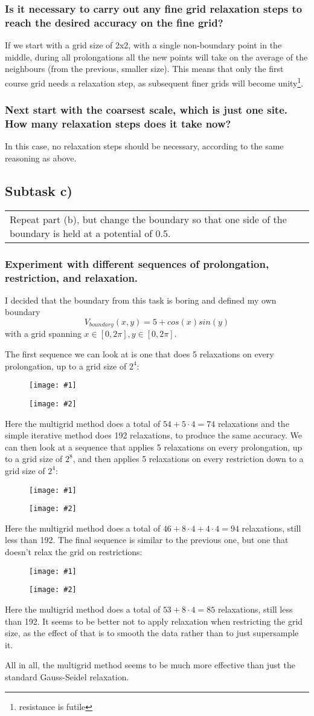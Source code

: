 \documentclass[11pt]{article}
\newcommand{\doublefigure}[2]{
\begin{figure}[H]
  \centering
  \begin{minipage}{0.4\textwidth}
    \centering
    \texttt{[image: \#1]}
  \end{minipage}
  \begin{minipage}{0.4\textwidth}
    \centering
    \texttt{[image: \#2]}
  \end{minipage}
\end{figure}
}
\newcommand{\task}[2]{
  \subsection*{Subtask #1)}
  \begin{tabular}{|p{0.9\textwidth}}
    #2\\
  \end{tabular}
}
\newcommand{\subtask}[1]{
  \subsubsection*{#1}
}
\begin{document}
\subtask{Is it necessary to carry out any fine grid relaxation steps to reach the desired accuracy on the fine grid?}
If we start with a grid size of 2x2, with a single non-boundary point in the middle, during all prolongations all the new points will take on the average of the neighbours (from the previous, smaller size).
This means that only the first course grid needs a relaxation step, as subsequent finer grids will become unity\footnote{resistance is futile}.

\subtask{Next start with the coarsest scale, which is just one site. How many relaxation steps does it take now?}
In this case, no relaxation steps should be necessary, according to the same reasoning as above.

\task{c}{
  Repeat part (b), but change the boundary so that one side of the boundary is held at a potential of 0.5.
}
\subtask{Experiment with different sequences of prolongation, restriction, and relaxation.}
I decided that the boundary from this task is boring and defined my own boundary
$$
V_{boundary}(x,y) = 5 + cos(x) sin(y)
$$
with a grid spanning $x\in[0, 2\pi], y\in[0, 2\pi]$.

The first sequence we can look at is one that does 5 relaxations on every prolongation, up to a grid size of $2^4$:
\doublefigure{./plots/1026/a_baseline_2.png}{./plots/1026/a_multigrid_2.png}
Here the multigrid method does a total of $54 + 5 \cdot 4 = 74$ relaxations and the simple iterative method does 192 relaxations, to produce the same accuracy.
\break
We can then look at a sequence that applies 5 relaxations on every prolongation, up to a grid size of $2^8$,
and then applies 5 relaxations on every restriction down to a grid size of $2^4$:
\doublefigure{./plots/1026/a_baseline_3.png}{./plots/1026/a_multigrid_3.png}
Here the multigrid method does a total of $46 + 8 \cdot 4 + 4 \cdot 4 = 94$ relaxations, still less than 192.
\break
The final sequence is similar to the previous one, but one that doesn't relax the grid on restrictions:
\doublefigure{./plots/1026/a_baseline_4.png}{./plots/1026/a_multigrid_4.png}
Here the multigrid method does a total of $53 + 8 \cdot 4 = 85$ relaxations, still less than 192.
It seems to be better not to apply relaxation when restricting the grid size, as the effect of that is to smooth the data rather than to just supersample it.

All in all, the multigrid method seems to be much more effective than just the standard Gauss-Seidel relaxation.
\end{document}
